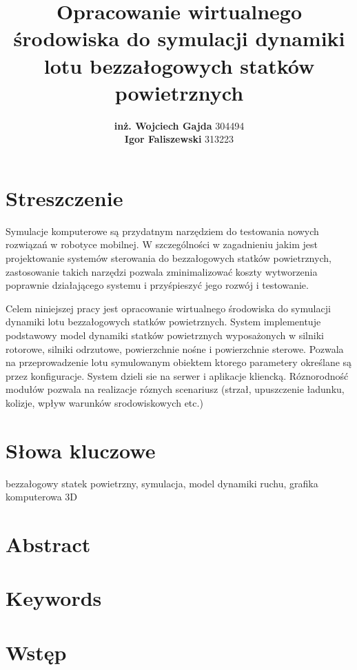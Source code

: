 \documentclass[15pt]{sprawozdanie}
\title{Opracowanie wirtualnego środowiska do symulacji dynamiki lotu bezzałogowych statków powietrznych}
\author{\textbf{inż. Wojciech Gajda} 304494\\\vspace{20pt}\textbf{Igor Faliszewski} 313223}
\begin{document}
\maketitle

\section*{Streszczenie}

\color{red}
Symulacje komputerowe są przydatnym narzędziem do testowania nowych rozwiązań w robotyce mobilnej. W szczególności w zagadnieniu jakim jest projektowanie systemów sterowania do bezzałogowych statków powietrznych, zastosowanie takich narzędzi pozwala zminimalizować koszty wytworzenia poprawnie działającego systemu i przyśpieszyć jego rozwój i testowanie.

Celem niniejszej pracy jest opracowanie wirtualnego środowiska do symulacji dynamiki lotu bezzałogowych statków powietrznych. System implementuje podstawowy model dynamiki statków powietrznych wyposażonych w silniki rotorowe, silniki odrzutowe, powierzchnie nośne i powierzchnie sterowe. Pozwala na przeprowadzenie lotu symulowanym obiektem ktorego parametery określane są przez konfiguracje. System dzieli sie na serwer i aplikacje kliencką. Róznorodność modułów pozwala na realizacje róznych scenariusz (strzał, upuszczenie ładunku, kolizje, wpływ warunków srodowiskowych etc.)


\color{black}

\section*{Słowa kluczowe}

bezzałogowy statek powietrzny, symulacja, model dynamiki ruchu, grafika komputerowa 3D

\newpage

\section*{Abstract}

\section*{Keywords}

\newpage
\tableofcontents

\newpage


\color{red}

\section{Wstęp}
\end{document}
